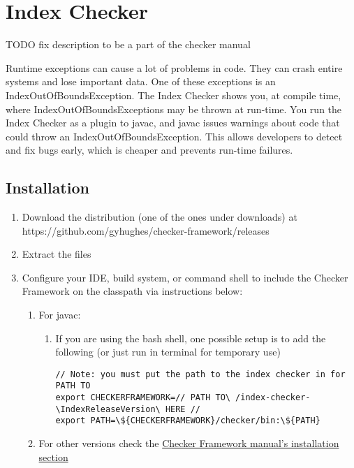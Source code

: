 \chapter{Index Checker\label{index-checker}}

TODO fix description to be a part of the checker manual

Runtime exceptions can cause a lot of problems in code. They can crash entire systems
and lose important data. One of these exceptions is an IndexOutOfBoundsException. The
Index Checker shows you, at compile time, where IndexOutOfBoundsExceptions may be thrown
at run-time. You run the Index Checker as a plugin to javac, and javac issues warnings
about code that could throw an IndexOutOfBoundsException. This allows developers to
detect and fix bugs early, which is cheaper and prevents run-time failures.

\section{Installation\label{index-installation}}

\begin{enumerate}
\item Download the distribution (one of the ones under downloads) at
https://github.com/gyhughes/checker-framework/releases
\item Extract the files
\item Configure your IDE, build system, or command shell to include the
Checker Framework on the classpath via instructions below:
\begin{enumerate}
\item For javac:
\begin{enumerate}
\item If you are using the bash shell, one possible setup is to add the following
(or just run in terminal for temporary use)

\begin{Verbatim}
// Note: you must put the path to the index checker in for PATH TO
export CHECKERFRAMEWORK=// PATH TO\ /index-checker-\IndexReleaseVersion\ HERE //
export PATH=\${CHECKERFRAMEWORK}/checker/bin:\${PATH}
\end{Verbatim}

\end{enumerate}
\item For other versions check the
\href{http://types.cs.washington.edu/checker-framework/current/checker-framework-manual.html#installation}
{Checker Framework manual's installation section}
\end{enumerate}
\end{enumerate}

